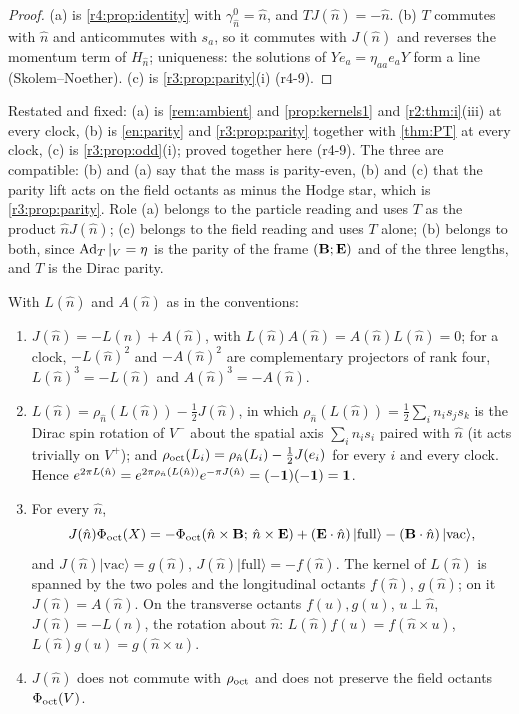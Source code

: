 \begin{proof}
(a) is \cref{r4:prop:identity} with $\gamma^0_{\hat n}=\hat n$, and $TJ(\hat n)=-\hat n$. (b) $T$ commutes with $\hat n$ and anticommutes with $s_a$, so it commutes with $J(\hat n)$ and
reverses the momentum term of $H_{\hat n}$; uniqueness: the solutions of $Ye_a=\eta_{aa}e_aY$ form a line (Skolem--Noether). (c) is
\cref{r3:prop:parity}(i) (r4-9).
\end{proof}

Restated and fixed: (a) is \cref{rem:ambient} and \cref{prop:kernels1} and \cref{r2:thm:i}(iii) at every clock, (b) is \cref{en:parity} and
\cref{r3:prop:parity} together with \cref{thm:PT} at every clock, (c) is \cref{r3:prop:odd}(i); proved together here (r4-9). The three are
compatible: (b) and (a) say that the mass is parity-even, (b) and (c) that the parity lift acts on the field octants as minus the Hodge star, which is
\cref{r3:prop:parity}. Role (a) belongs to the particle reading and uses $T$ as the product $\hat nJ(\hat n)$; (c) belongs to the field reading and uses $T$
alone; (b) belongs to both, since $\Ad_T|_V=\eta$ is the parity of the frame $(\bB;\bE)$ and of the three lengths, and $T$ is the Dirac parity.

\begin{proposition}
\label{r4:prop:Jdec}
With $L(\hat n)$ and $A(\hat n)$ as in the conventions:
\begin{enumerate}[label=(\roman*),leftmargin=2.2em]
\item $J(\hat n)=-L(\hat n)+A(\hat n)$, with $L(\hat n)A(\hat n)=A(\hat n)L(\hat n)=0$; for a clock, $-L(\hat n)^2$ and $-A(\hat n)^2$ are complementary projectors of rank four, $L(\hat n)^3=-L(\hat n)$ and
$A(\hat n)^3=-A(\hat n)$.
\item $L(\hat n)=\rho_{\hat n}(L(\hat n))-\tfrac12J(\hat n)$, in which $\rho_{\hat n}(L(\hat n))=\tfrac12\sum_in_is_js_k$ is the Dirac spin rotation of $V^-$ about the spatial axis
$\sum_in_is_i$ paired with $\hat n$ (it acts trivially on $V^+$); and $\rho_{\rm oct}(L_i)=\rho_{\hat n}(L_i)-\tfrac12J(e_i)$ for
every $i$ and every clock. Hence $e^{2\pi L(\hat n)}=e^{2\pi\rho_{\hat n}(L(\hat n))}e^{-\pi J(\hat n)}=(-\id)(-\id)=\id$.
\item For every $\hat n$,
\[
J(\hat n)\Phi_{\rm oct}(X)=-\Phi_{\rm oct}(\hat n\times\bB;\,\hat n\times\bE)+(\bE\cdot \hat n)\,|\mathrm{full}\rangle-(\bB\cdot \hat n)\,|\mathrm{vac}\rangle ,
\]
and $J(\hat n)|\mathrm{vac}\rangle=g(\hat n)$, $J(\hat n)|\mathrm{full}\rangle=-f(\hat n)$. The kernel of $L(\hat n)$ is spanned by the two poles and the longitudinal octants $f(\hat n)$, $g(\hat n)$;
on it $J(\hat n)=A(\hat n)$. On the transverse octants $f(u),g(u)$, $u\perp \hat n$, $J(\hat n)=-L(\hat n)$, the rotation about $\hat n$: $L(\hat n)f(u)=f(\hat n\times u)$, $L(\hat n)g(u)=g(\hat n\times u)$.
\item $J(\hat n)$ does not commute with $\rho_{\rm oct}$ and does not preserve the field octants $\Phi_{\rm oct}(V)$.
\end{enumerate}
\end{proposition}

